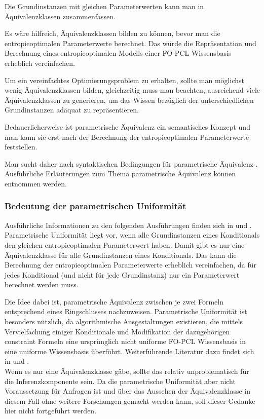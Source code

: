 \documentclass[draft]{scrreprt}
\begin{document}
Die Grundinstanzen mit gleichen Parameterwerten kann man in Äquivalenzklassen zusammenfassen. 

Es wäre hilfreich, Äquivalenzklassen bilden zu können, bevor man die entropieoptimalen Parameterwerte berechnet. Das würde die Repräsentation und Berechnung eines entropieoptimalen Modells einer FO-PCL Wissensbasis erheblich vereinfachen.

Um ein vereinfachtes Optimierungsproblem zu erhalten, sollte man möglichst wenig Äquivalenzklassen bilden, gleichzeitig muss man beachten, ausreichend viele Äquivalenzklassen zu generieren, um das Wissen bezüglich der unterschiedlichen Grundinstanzen adäquat zu repräsentieren.

Bedauerlicherweise ist parametrische Äquivalenz  ein semantisches Konzept und man kann sie erst nach der Berechnung der entropieoptimalen Parameterwerte feststellen.

Man sucht daher nach syntaktischen Bedingungen für parametrische Äquivalenz . Ausführliche Erläuterungen zum Thema parametrische Äquivalenz können \cite[Kap. 7.1, S. 148ff]{Fis10} entnommen werden.

\subsubsection{Bedeutung der parametrischen Uniformität} 
Ausführliche Informationen zu den folgenden Ausführungen finden sich in \cite[Kap. 7.1.1 und 7.1.2, S. 151-153]{Fis10} und \cite{BHM14}.
Parametrische Uniformität liegt vor, wenn alle Grundinstanzen eines Konditionals den gleichen entropieoptimalen Parameterwert haben. Damit gibt es nur eine Äquivalenzklasse für alle Grundinstanzen eines Konditionals. Das kann die Berechnung der entropieoptimalen Parameterwerte erheblich vereinfachen, da für jedes Konditional (und nicht für jede Grundinstanz) nur ein Parameterwert berechnet werden muss. 

Die Idee dabei ist, parametrische Äquivalenz zwischen je zwei Formeln entsprechend eines Ringschlusses nachzuweisen.
Parametrische Uniformität ist besonders nützlich, da algorithmische Ausgestaltungen existieren, die mittels Vervielfachung einiger Konditionale und Modifikation der dazugehörigen constraint Formeln eine ursprünglich nicht uniforme FO-PCL Wissensbasis in eine uniforme Wissensbasis überführt. Weiterführende Literatur dazu findet sich in \cite[Kap. 5, S.71ff]{BJ11} und \cite{BK15}.\\
Wenn es nur eine Äquivalenzklasse gäbe, sollte das relativ unproblematisch für die Inferenzkomponente sein. Da die parametrische Uniformität aber nicht Voraussetzung für Anfragen ist und über das Aussehen der Äquivalenzklasse in diesem Fall ohne weitere Forschungen gemacht werden kann, soll dieser Gedanke hier nicht fortgeführt werden. 
\end{document}
